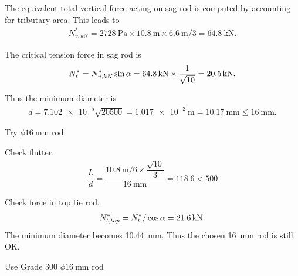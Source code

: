 \begin{solution}
The equivalent total vertical force acting on sag rod is computed by accounting for tributary area. This leads to
\begin{gather*}
N^*_{v,kN}=\SI{2728}{\pascal}\times\SI{10.8}{\meter}\times\SI{6.6}{\meter}/3=\SI{64.8}{\kilo\newton}.
\end{gather*}

The critical tension force in sag rod is
\begin{gather*}
N^*_t=N^*_{v,kN}\sin\alpha=\SI{64.8}{\kilo\newton}\times\dfrac{1}{\sqrt{10}}=\SI{20.5}{\kilo\newton}.
\end{gather*}
\begin{figure}[H]
\centering\footnotesize
{}
\end{figure}

Thus the minimum diameter is
\begin{gather*}
d=\num{7.102e-5}\sqrt{20500}=\SI{1.017e-2}{\meter}=\SI{10.17}{\mm}\le\SI{16}{\mm}.
\end{gather*}
\begin{flushright}
Try $\phi\SI{16}{\mm}$ rod
\end{flushright}

Check flutter.
\begin{gather}
\dfrac{L}{d}=\dfrac{\SI{10.8}{\meter}/6\times\dfrac{\sqrt{10}}{3}}{\SI{16}{\mm}}=118.6<500
\end{gather}

Check force in top tie rod.
\begin{gather*}
N^*_{t,top}=N^*_t/\cos\alpha=\SI{21.6}{\kilo\newton}.
\end{gather*}
The minimum diameter becomes \SI{10.44}{\mm}. Thus the chosen \SI{16}{\mm} rod is still OK.
\begin{figure}[H]
\centering\footnotesize
{}
\end{figure}
\begin{flushright}
Use Grade 300 $\phi\SI{16}{\mm}$ rod
\end{flushright}
\end{solution}